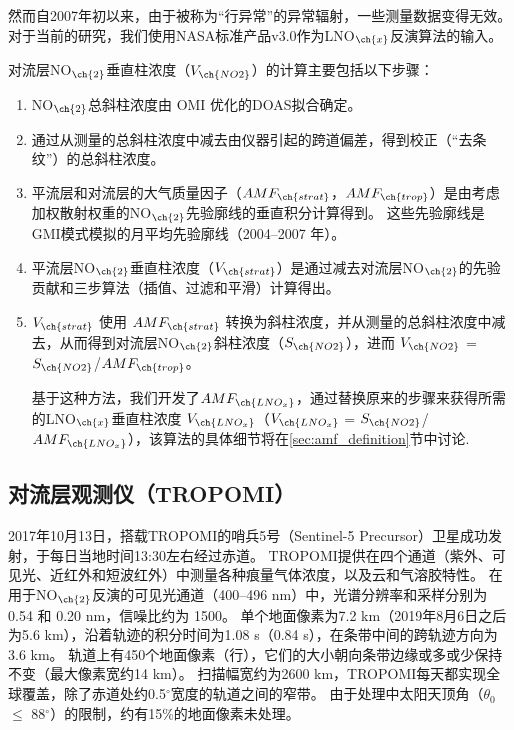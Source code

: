 然而自2007年初以来，由于被称为“行异常”的异常辐射\citep{Dobber.2008}，一些测量数据变得无效。
对于当前的研究，我们使用NASA标准产品v3.0\citep{Krotkov.2017}作为LNO$_{\ch{x}}$反演算法的输入。

对流层NO$_{\ch{2}}$垂直柱浓度（$V_{\ch{NO2}}$）的计算主要包括以下步骤：

\begin{enumerate}[label=（\arabic*）, labelindent=\parindent, nosep, leftmargin=0pt, widest=0, itemindent=*, topsep=0pt, partopsep=0pt, parsep=0pt]

\item NO$_{\ch{2}}$总斜柱浓度由 OMI 优化的DOAS拟合确定。

\item 通过从测量的总斜柱浓度中减去由仪器引起的跨道偏差，得到校正（“去条纹”）的总斜柱浓度。

\item 平流层和对流层的大气质量因子（$AMF_{\ch{strat}}$，$AMF_{\ch{trop}}$）是由考虑加权散射权重的NO$_{\ch{2}}$先验廓线的垂直积分计算得到。
这些先验廓线是GMI模式模拟的月平均先验廓线（2004--2007 年）。

\item 平流层NO$_{\ch{2}}$垂直柱浓度（$V_{\ch{strat}}$）是通过减去对流层NO$_{\ch{2}}$的先验贡献和三步算法（插值、过滤和平滑）计算得出\citep{Bucsela.2013}。

\item $V_{\ch{strat}}$ 使用 $AMF_{\ch{strat}}$ 转换为斜柱浓度，并从测量的总斜柱浓度中减去，从而得到对流层NO$_{\ch{2}}$斜柱浓度（$S_{\ch{NO2}}$），进而 $V_{\ch{NO2}}$ = $S_{\ch{NO2}}$/$AMF_{\ch{trop}}$。

基于这种方法，我们开发了$AMF_{\ch{LNO_x}}$，通过替换原来的步骤来获得所需的LNO$_{\ch{x}}$垂直柱浓度 $V_{\ch{LNO_x}}$（$V_{\ch{LNO_x}}$ = $S_{\ch{NO2}}$/$AMF_{\ch{LNO_x}}$），该算法的具体细节将在\ref{sec:amf_definition}节中讨论.

\end{enumerate}

\subsection{对流层观测仪（TROPOMI）}

2017年10月13日，搭载TROPOMI的哨兵5号（Sentinel-5 Precursor）卫星成功发射\citep{Veefkind.2012}，于每日当地时间13:30左右经过赤道。
TROPOMI提供在四个通道（紫外、可见光、近红外和短波红外）中测量各种痕量气体浓度，以及云和气溶胶特性。
在用于NO$_{\ch{2}}$反演的可见光通道（400–496 nm）中，光谱分辨率和采样分别为 0.54 和 0.20 nm，信噪比约为 1500。
单个地面像素为7.2 km（2019年8月6日之后为5.6 km），沿着轨迹的积分时间为1.08 s（0.84 s），在条带中间的跨轨迹方向为 3.6 km。
轨道上有450个地面像素（行），它们的大小朝向条带边缘或多或少保持不变（最大像素宽约14 km）。
扫描幅宽约为2600 km，TROPOMI每天都实现全球覆盖，除了赤道处约0.5$^{\circ}$宽度的轨道之间的窄带。
由于处理中太阳天顶角（$\theta_0$ $\leq$ 88$^{\circ}$）的限制，约有15\%的地面像素未处理。

